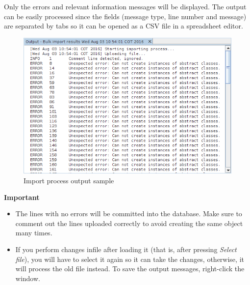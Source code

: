 \documentclass[a4paper]{article}
\begin{document}
				Only the errors and relevant information messages will be displayed. The output can be easily processed since the fields (message type, line number and message)	are separated by tabs so it can be opened as a CSV file in a spreadsheet editor. 
				
				\begin{figure}[h!]
					\centering
					\includegraphics[width=0.7\linewidth]{img/bulk_import_output_window.png}
					\caption{Import process output sample}
					\label{fig:bulk_import_output_window}
				\end{figure}	
				
				\newpage
				\begin{framed} {\large \textbf{Important}}
					\begin{itemize}
					\item The lines with no errors will be committed into the database. Make sure to comment out the lines uploaded correctly to avoid creating the same object many times.
					
					\item If you perform changes infile after loading it (that is, after pressing \textit{Select file}), you will have to select it again so it can take the changes, otherwise, it will process the old file instead. To save the output messages, right-click the window.
					\end{itemize}
				\end{framed}
				
\end{document}
